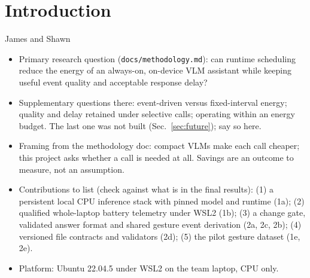 \section{Introduction}
\label{sec:intro}
\begin{notes}{James and Shawn}
\begin{itemize}\setlength\itemsep{0pt}
\item Primary research question (\texttt{docs/methodology.md}): can runtime scheduling reduce the energy of an always-on, on-device VLM assistant while keeping useful event quality and acceptable response delay?
\item Supplementary questions there: event-driven versus fixed-interval energy; quality and delay retained under selective calls; operating within an energy budget. The last one was not built (Sec.~\ref{sec:future}); say so here.
\item Framing from the methodology doc: compact VLMs make each call cheaper; this project asks whether a call is needed at all. Savings are an outcome to measure, not an assumption.
\item Contributions to list (check against what is in the final results): (1) a persistent local CPU inference stack with pinned model and runtime (1a); (2) qualified whole-laptop battery telemetry under WSL2 (1b); (3) a change gate, validated answer format and shared gesture event derivation (2a, 2c, 2b); (4) versioned file contracts and validators (2d); (5) the pilot gesture dataset (1e, 2e).
\item Platform: Ubuntu 22.04.5 under WSL2 on the team laptop, CPU only.
\end{itemize}
\end{notes}
